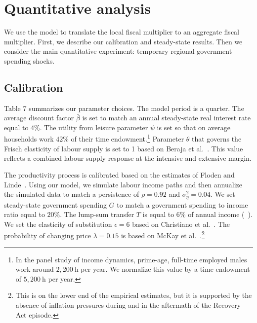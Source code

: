 \documentclass[\latexroot/\projectname]{subfiles}
\begin{document}
\FloatBarrier
\section{Quantitative analysis}
\whenintegrated{\label{sec:quantitative-analysis}} %

We use the model to translate the local fiscal multiplier to an aggregate fiscal multiplier. First, we describe our calibration and steady-state results. Then we consider the main quantitative experiment: temporary regional government spending shocks.



\subsection{Calibration}
Table 7 summarizes our parameter choices. The model period is a quarter. The average discount factor $\bar{\beta}$ is set to match an annual steady-state real interest rate equal to $4 \%$. The utility from leisure parameter $\psi$ is set so that on average households work $42 \%$ of their time endowment.\footnote{In the panel study of income dynamics, prime-age, full-time employed males work around $2,200 \mathrm{~h}$ per year. We normalize this value by a time endowment of $5,200 \mathrm{~h}$ per year.} Parameter $\theta$ that governs the Frisch elasticity of labour supply is set to 1 based on Beraja et al.~\cite{Beraja2016-km}. This value reflects a combined labour supply response at the intensive and extensive margin.

The productivity process is calibrated based on the estimates of Floden and Linde~\cite{Floden2001-vb}. Using our model, we simulate labour income paths and then annualize the simulated data to match a persistence of $\rho=0.92$ and $\sigma_{\eta}^{2}=0.04$. We set steady-state government spending $G$ to match a government spending to income ratio equal to $20 \%$. The lump-sum transfer $T$ is equal to $6 \%$ of annual income (~\cite{Kaplan2018-sr}). We set the elasticity of substitution $\epsilon=6$ based on Christiano et al.~\cite{Christiano2011-ro}. The probability of changing price $\lambda=0.15$ is based on McKay et al.~\cite{McKay2016-si}.\footnote{This is on the lower end of the empirical estimates, but it is supported by the absence of inflation pressures during and in the aftermath of the Recovery Act episode.}
\end{document}
